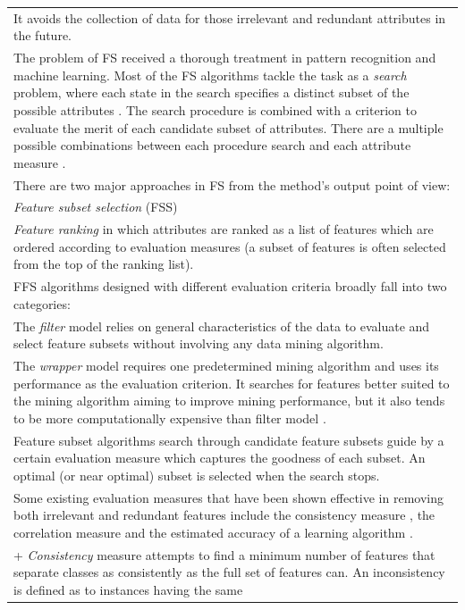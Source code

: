 \documentclass[
]{book}
\begin{document}
\begin{longtable}[]{@{}
  >{\raggedleft\arraybackslash}p{}@{}}
* It avoids the collection of data for those irrelevant and redundant attributes in the future. \\
The problem of FS received a thorough treatment in pattern recognition and machine learning. Most of the FS algorithms tackle the task as a \emph{search} problem, where each
state in the search specifies a distinct subset of the possible attributes \citep{BL97}. The search procedure is combined with a criterion to evaluate the merit of each candidate subset of attributes. There are a multiple possible combinations between each procedure search and each attribute measure \citep{LY05}. \\
There are two major approaches in FS from the method's output point of view: \\
* \emph{Feature subset selection} (FSS) \\
* \emph{Feature ranking} in which attributes are ranked as a list of features which are ordered according to evaluation measures (a subset of features is often selected from the top of the ranking list). \\
FFS algorithms designed with different evaluation criteria broadly fall into two categories: \\
* The \emph{filter} model relies on general characteristics of the data to evaluate and select feature subsets without involving any data mining algorithm. \\
* The \emph{wrapper} model requires one predetermined mining algorithm and uses its performance as the evaluation criterion. It searches for features better suited to the mining algorithm aiming to improve mining performance, but it also tends to be more computationally expensive than filter model \citep[\citet{Lan94}]{KJ97}. \\
Feature subset algorithms search through candidate feature subsets guide by a certain evaluation measure \citep{LM98} which captures the goodness of each subset. An optimal (or near optimal) subset is selected when the search stops. \\
Some existing evaluation measures that have been shown effective in removing both irrelevant and redundant features include the consistency measure \citep{DLM00}, the correlation measure \citep{Hal99} and the estimated accuracy of a learning algorithm \citep{KJ97}. \\
+ \emph{Consistency} measure attempts to find a minimum number of features that separate classes as consistently as the full set of features can. An inconsistency is defined as to instances having the same

\end{longtable}
\end{document}
